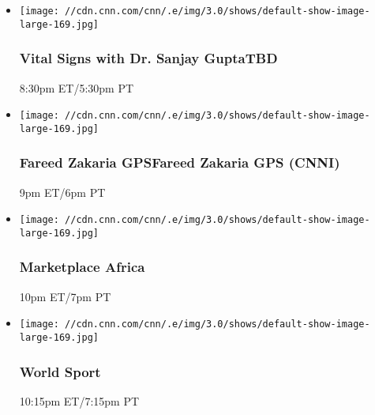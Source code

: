 \begin{itemize}
\item
  \texttt{[image: //cdn.cnn.com/cnn/.e/img/3.0/shows/default-show-image-large-169.jpg]}

  \hypertarget{vital-signs-with-dr-sanjay-guptatbd--1}{%
  \subsubsection{Vital Signs with Dr. Sanjay GuptaTBD
  }\label{vital-signs-with-dr-sanjay-guptatbd--1}}

  8:30pm ET/5:30pm PT
\end{itemize}

\begin{itemize}
\item
  \texttt{[image: //cdn.cnn.com/cnn/.e/img/3.0/shows/default-show-image-large-169.jpg]}

  \hypertarget{fareed-zakaria-gpsfareed-zakaria-gps-cnni-}{%
  \subsubsection{Fareed Zakaria GPSFareed Zakaria GPS (CNNI)
  }\label{fareed-zakaria-gpsfareed-zakaria-gps-cnni-}}

  9pm ET/6pm PT
\end{itemize}

\begin{itemize}
\item
  \texttt{[image: //cdn.cnn.com/cnn/.e/img/3.0/shows/default-show-image-large-169.jpg]}

  \hypertarget{marketplace-africa-2}{%
  \subsubsection{Marketplace Africa}\label{marketplace-africa-2}}

  10pm ET/7pm PT
\end{itemize}

\begin{itemize}
\item
  \texttt{[image: //cdn.cnn.com/cnn/.e/img/3.0/shows/default-show-image-large-169.jpg]}

  \hypertarget{world-sport-4}{%
  \subsubsection{World Sport}\label{world-sport-4}}

  10:15pm ET/7:15pm PT
\end{itemize}

